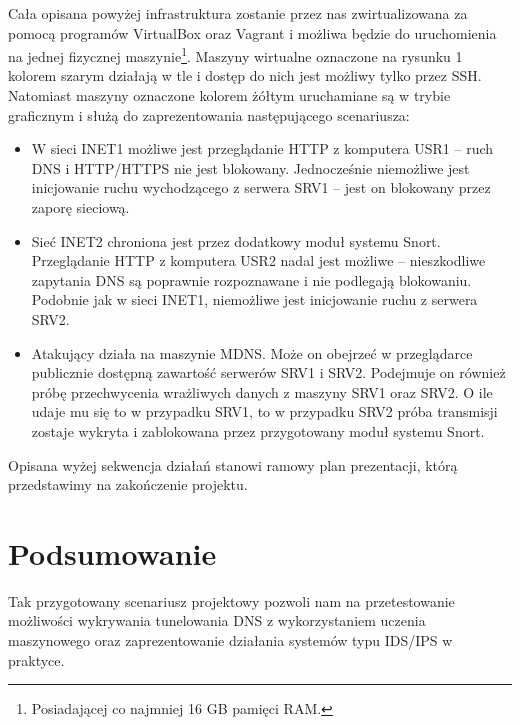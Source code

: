 \documentclass{eiti-raport}
\begin{document}
Cała opisana powyżej infrastruktura zostanie przez nas zwirtualizowana za pomocą programów VirtualBox oraz Vagrant i możliwa będzie do uruchomienia na jednej fizycznej maszynie\footnote{Posiadającej co najmniej 16 GB pamięci RAM.}. Maszyny wirtualne oznaczone na rysunku 1 kolorem szarym działają w tle i dostęp do nich jest możliwy tylko przez SSH. Natomiast maszyny oznaczone kolorem żółtym uruchamiane są w trybie graficznym i służą do zaprezentowania następującego scenariusza:
\begin{itemize}
	\item W sieci INET1 możliwe jest przeglądanie HTTP z komputera USR1 -- ruch DNS i HTTP/HTTPS nie jest blokowany. Jednocześnie niemożliwe jest inicjowanie ruchu wychodzącego z serwera SRV1 -- jest on blokowany przez zaporę sieciową. 
	\item Sieć INET2 chroniona jest przez dodatkowy moduł systemu Snort. Przeglądanie HTTP z komputera USR2 nadal jest możliwe -- nieszkodliwe zapytania DNS są poprawnie rozpoznawane i nie podlegają blokowaniu. Podobnie jak w sieci INET1, niemożliwe jest inicjowanie ruchu z serwera SRV2. 
	\item Atakujący działa na maszynie MDNS. Może on obejrzeć w przeglądarce publicznie dostępną zawartość serwerów SRV1 i SRV2. Podejmuje on również próbę przechwycenia wrażliwych danych z maszyny SRV1 oraz SRV2. O ile udaje mu się to w przypadku SRV1, to w przypadku SRV2 próba transmisji zostaje wykryta i zablokowana przez przygotowany moduł systemu Snort. 
\end{itemize}
Opisana wyżej sekwencja działań stanowi ramowy plan prezentacji, którą przedstawimy na zakończenie projektu. 

\section{Podsumowanie} \label{sec:summary}
Tak przygotowany scenariusz projektowy pozwoli nam na przetestowanie możliwości wykrywania tunelowania DNS z wykorzystaniem uczenia maszynowego oraz zaprezentowanie działania systemów typu IDS/IPS w praktyce. 
\end{document}
